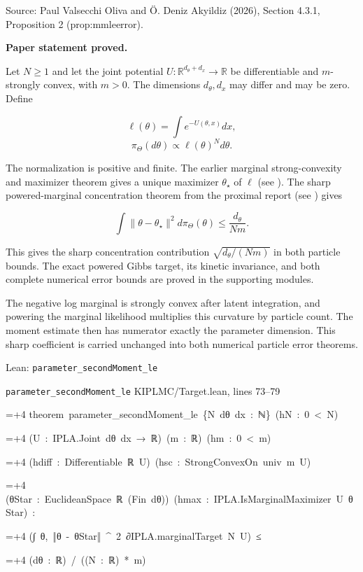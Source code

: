 \documentclass[11pt,a4paper]{report}
\newlength{\leancharwidth}
\newenvironment{leancode}{\par\smallskip\begingroup\ttfamily\footnotesize\raggedright
  \settowidth{\leancharwidth}{M}\setlength{\parskip}{0pt}\setlength{\parindent}{0pt}
  \frenchspacing}{\par\endgroup\smallskip}
\newcommand{\leanline}[2]{\hangindent=\dimexpr#1\leancharwidth+4\leancharwidth\relax
  \hangafter=1\noindent\hspace*{#1\leancharwidth}#2\par}
\newcommand{\leansource}[1]{\par{\footnotesize\color{leanmuted}#1}\par}
\begin{document}
Source: Paul Valsecchi Oliva and Ö. Deniz Akyildiz (2026), Section 4.3.1, Proposition 2 (prop:mmleerror).



\textbf{Paper statement proved.}



Let \(N\ge1\) and let the joint potential
\(U:\mathbb R^{d_\theta+d_x}\to\mathbb R\) be differentiable and
\(m\)-strongly convex, with \(m>0\). The dimensions \(d_\theta,d_x\)
may differ and may be zero. Define


\[\ell(\theta)=\int e^{-U(\theta,x)}dx,\]
\[\pi_\Theta(d\theta)\propto\ell(\theta)^N d\theta.\]


The normalization is positive and finite. The earlier marginal strong-convexity and maximizer theorem gives a unique maximizer
\(\theta_\star\) of \(\ell\) (see \cite[Section~3.12.4]{LangevinLean2026IPLA}). The sharp powered-marginal concentration theorem from the proximal report (see \cite[Section~3.6.1]{LangevinLean2026Proximal}) gives


\[\boxed{\int\|\theta-\theta_\star\|^2d\pi_\Theta(\theta)
\le\frac{d_\theta}{Nm}.}\]


This gives the sharp concentration contribution
\(\sqrt{d_\theta/(Nm)}\) in both particle bounds. The exact powered Gibbs target, its kinetic invariance, and both complete numerical error bounds are proved in the supporting modules.



The negative log marginal is strongly convex after latent integration, and powering the marginal likelihood multiplies this curvature by particle count. The moment estimate then has numerator exactly the parameter dimension. This sharp coefficient is carried unchanged into both numerical particle error theorems.

\begin{leanbox}{Lean: \texttt{parameter\_\allowbreak{}secondMoment\_\allowbreak{}le}}
\leansource{\texttt{parameter\_\allowbreak{}secondMoment\_\allowbreak{}le} \quad KIPLMC/\allowbreak{}Target.lean, lines 73–79}
\begin{leancode}
\leanline{0}{theorem\ parameter\_secondMoment\_le\ \{N\ dθ\ dx\ :\ ℕ\}\ (hN\ :\ 0\ <\ N)}
\leanline{4}{(U\ :\ IPLA.Joint\ dθ\ dx\ →\ ℝ)\ (m\ :\ ℝ)\ (hm\ :\ 0\ <\ m)}
\leanline{4}{(hdiff\ :\ Differentiable\ ℝ\ U)\ (hsc\ :\ StrongConvexOn\ univ\ m\ U)}
\leanline{4}{(θStar\ :\ EuclideanSpace\ ℝ\ (Fin\ dθ))\ (hmax\ :\ IPLA.IsMarginalMaximizer\ U\ θStar)\ :}
\leanline{4}{(∫\ θ,\ ‖θ\ -\ θStar‖\ \textasciicircum{}\ 2\ ∂IPLA.marginalTarget\ N\ U)\ ≤}
\leanline{6}{(dθ\ :\ ℝ)\ /\ ((N\ :\ ℝ)\ *\ m)}
\end{leancode}
\end{leanbox}
\end{document}
